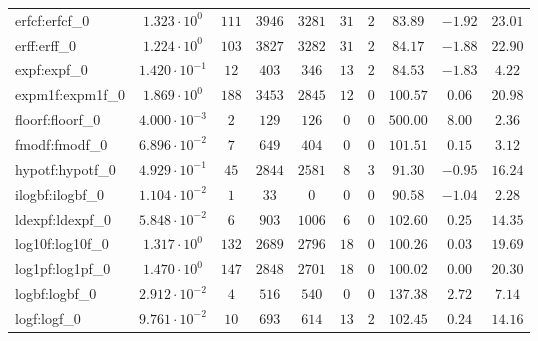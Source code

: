 \begin{tabular}{|l|c|c|c|c|c|c|c|c|c|}
erfcf:erfcf\_0               & $ 1.323 \cdot 10^{0}  $ & $ 111    $ & $ 3946  $ & $ 3281  $ & $ 31  $ & $ 2  $ & $ 83.89       $ & $ -1.92   $ & $ 23.01   $ \\
erff:erff\_0                 & $ 1.224 \cdot 10^{0}  $ & $ 103    $ & $ 3827  $ & $ 3282  $ & $ 31  $ & $ 2  $ & $ 84.17       $ & $ -1.88   $ & $ 22.90   $ \\
expf:expf\_0                 & $ 1.420 \cdot 10^{-1} $ & $ 12     $ & $ 403   $ & $ 346   $ & $ 13  $ & $ 2  $ & $ 84.53       $ & $ -1.83   $ & $ 4.22    $ \\
expm1f:expm1f\_0             & $ 1.869 \cdot 10^{0}  $ & $ 188    $ & $ 3453  $ & $ 2845  $ & $ 12  $ & $ 0  $ & $ 100.57      $ & $ 0.06    $ & $ 20.98   $ \\
floorf:floorf\_0             & $ 4.000 \cdot 10^{-3} $ & $ 2      $ & $ 129   $ & $ 126   $ & $ 0   $ & $ 0  $ & $ 500.00      $ & $ 8.00    $ & $ 2.36    $ \\
fmodf:fmodf\_0               & $ 6.896 \cdot 10^{-2} $ & $ 7      $ & $ 649   $ & $ 404   $ & $ 0   $ & $ 0  $ & $ 101.51      $ & $ 0.15    $ & $ 3.12    $ \\
hypotf:hypotf\_0             & $ 4.929 \cdot 10^{-1} $ & $ 45     $ & $ 2844  $ & $ 2581  $ & $ 8   $ & $ 3  $ & $ 91.30       $ & $ -0.95   $ & $ 16.24   $ \\
ilogbf:ilogbf\_0             & $ 1.104 \cdot 10^{-2} $ & $ 1      $ & $ 33    $ & $ 0     $ & $ 0   $ & $ 0  $ & $ 90.58       $ & $ -1.04   $ & $ 2.28    $ \\
ldexpf:ldexpf\_0             & $ 5.848 \cdot 10^{-2} $ & $ 6      $ & $ 903   $ & $ 1006  $ & $ 6   $ & $ 0  $ & $ 102.60      $ & $ 0.25    $ & $ 14.35   $ \\
log10f:log10f\_0             & $ 1.317 \cdot 10^{0}  $ & $ 132    $ & $ 2689  $ & $ 2796  $ & $ 18  $ & $ 0  $ & $ 100.26      $ & $ 0.03    $ & $ 19.69   $ \\
log1pf:log1pf\_0             & $ 1.470 \cdot 10^{0}  $ & $ 147    $ & $ 2848  $ & $ 2701  $ & $ 18  $ & $ 0  $ & $ 100.02      $ & $ 0.00    $ & $ 20.30   $ \\
logbf:logbf\_0               & $ 2.912 \cdot 10^{-2} $ & $ 4      $ & $ 516   $ & $ 540   $ & $ 0   $ & $ 0  $ & $ 137.38      $ & $ 2.72    $ & $ 7.14    $ \\
logf:logf\_0                 & $ 9.761 \cdot 10^{-2} $ & $ 10     $ & $ 693   $ & $ 614   $ & $ 13  $ & $ 2  $ & $ 102.45      $ & $ 0.24    $ & $ 14.16   $ \\

\end{tabular}
